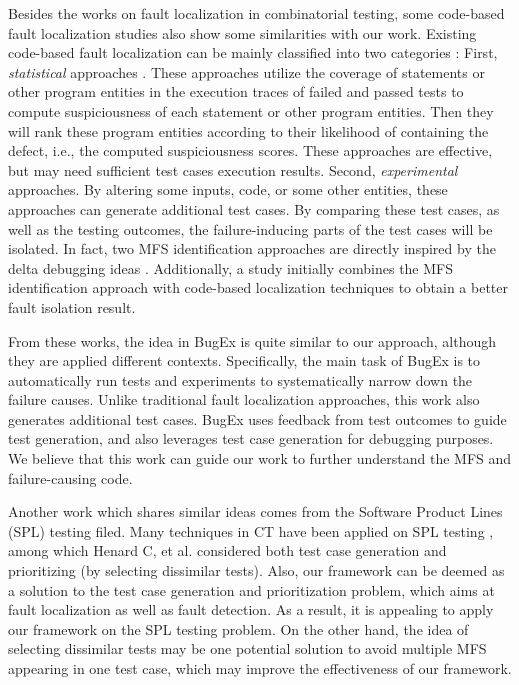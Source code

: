 \documentclass[10pt,journal,compsoc]{IEEEtran}
\begin{document}
Besides the works on fault localization in combinatorial testing, some code-based fault localization studies also show some similarities with our work. Existing code-based fault localization can be mainly classified into two categories \cite{robetaler2012isolating}:  First, \emph{statistical}
approaches \cite{jones2002visualization,liblit2003bug,liu2005sober}.  These approaches utilize the coverage of statements or other program entities in the execution traces of failed and passed tests to compute suspiciousness of each statement or other program entities. Then they will rank these program entities according to their likelihood of containing the defect, i.e., the computed suspiciousness scores. These approaches are effective, but may need sufficient test cases execution results. Second, \emph{experimental} approaches\cite{zeller2002simplifying,zeller1999yesterday,misherghi2006hdd}. By altering some inputs, code, or some other entities, these approaches can generate additional test cases. By comparing these test cases, as well as the testing outcomes, the failure-inducing parts of the test cases will be isolated. In fact, two MFS identification approaches are directly inspired by the delta debugging ideas \cite{zhang2011characterizing,li2012improved}. Additionally, a study \cite{ghandehari2013fault} initially combines the MFS identification approach with code-based localization techniques to obtain a better fault isolation result.

From these works, the idea in BugEx \cite{robetaler2012isolating} is quite similar to our approach, although they are applied different contexts. Specifically, the main task of BugEx is to automatically run tests and experiments to systematically narrow down the failure causes. Unlike traditional fault localization approaches, this work also generates additional test cases. BugEx uses feedback from test outcomes to guide test generation, and also leverages test case generation for debugging purposes. We believe that this work can guide our work to further understand the MFS and failure-causing code.

Another work which shares similar ideas comes from the Software Product Lines (SPL) testing filed\cite{henard2014bypassing,perrouin2010automated,lopez2014parallel,lopez2015first}. Many techniques in CT have been applied on SPL testing \cite{lopez2015first}, among which Henard C, et al. \cite{henard2014bypassing} considered both test case generation and prioritizing (by selecting dissimilar tests). Also, our framework can be deemed as a solution to the test case generation and prioritization problem, which aims at fault localization as well as fault detection. As a result, it is appealing to apply our framework on the SPL testing problem. On the other hand, the idea of selecting dissimilar tests may be one potential solution to avoid multiple MFS appearing in one test case, which may improve the effectiveness of our framework.
\end{document}
